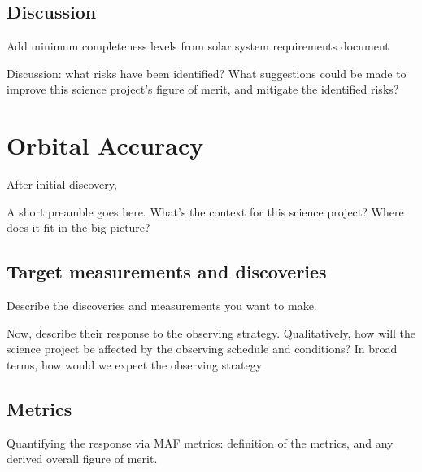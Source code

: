\subsection{Discussion}
\label{sec:\secname:discussion}

Add minimum completeness levels from solar system requirements
document



Discussion: what risks have been identified? What suggestions could be
made to improve this science project's figure of merit, and mitigate
the identified risks?

\navigationbar


\section{Orbital Accuracy}
\def\secname{\chpname:orbits}\label{sec:\secname}

After initial discovery, 

A short preamble goes here. What's the context for this science
project? Where does it fit in the big picture?


\subsection{Target measurements and discoveries}
\label{sec:\secname:targets}

Describe the discoveries and measurements you want to make.

Now, describe their response to the observing strategy. Qualitatively,
how will the science project be affected by the observing schedule and
conditions? In broad terms, how would we expect the observing strategy




\subsection{Metrics}
\label{sec:\secname:metrics}

Quantifying the response via MAF metrics: definition of the metrics,
and any derived overall figure of merit.



